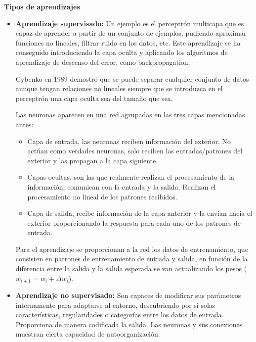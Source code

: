 \documentclass[12pt, twoside, openright]{report} %
\begin{document}
\textbf{Tipos de aprendizajes}
\begin{itemize}
	\item \textbf{Aprendizaje supervisado:} Un ejemplo es el perceptrón multicapa que es capaz de aprender a partir de un conjunto de ejemplos, pudiendo aproximar funciones no lineales, filtrar ruido en los datos, etc. Este aprendizaje se ha conseguido introduciendo la capa oculta y aplicando los algoritmos de aprendizaje de descenso del error, como backpropagation.
	      
	      Cybenko en 1989 demostró que se puede separar cualquier conjunto de datos aunque tengan relaciones no lineales siempre que se introduzca en el perceptrón una capa oculta sea del tamaño que sea.
	      
	      Las neuronas aparecen en una red agrupadas en las tres capas mencionadas antes:
	      \begin{itemize}
		      \item Capa de entrada, las neuronas reciben información del exterior. No actúan como verdades neuronas, solo reciben las entradas/patrones del exterior y las propagan a la capa siguiente.
		      \item Capas ocultas, son las que realmente realizan el procesamiento de la información, comunican con la entrada y la salida. Realizan el procesamiento no lineal de los patrones recibidos.
		      \item Capa de salida, recibe información de la capa anterior y la envían hacia el exterior proporcionando la respuesta para cada uno de los patrones de entrada.
	      \end{itemize}
	      
	      Para el aprendizaje se proporcionan a la red los datos de entrenamiento, que consisten en patrones de entrenamiento de entrada y salida, en función de la diferencia entre la salida y la salida esperada se van actualizando los pesos ($w_{i+1}=w_i+\Delta w_i$).
	\item \textbf{Aprendizaje no supervisado:} Son capaces de modificar sus parámetros internamente para adaptarse al entorno, descubriendo por si solas características, regularidades o categorías entre los datos de entrada. Proporciona de manera codificada la salida. Las neuronas y sus conexiones muestran cierta capacidad de autoorganización.
\end{itemize}
\end{document}
